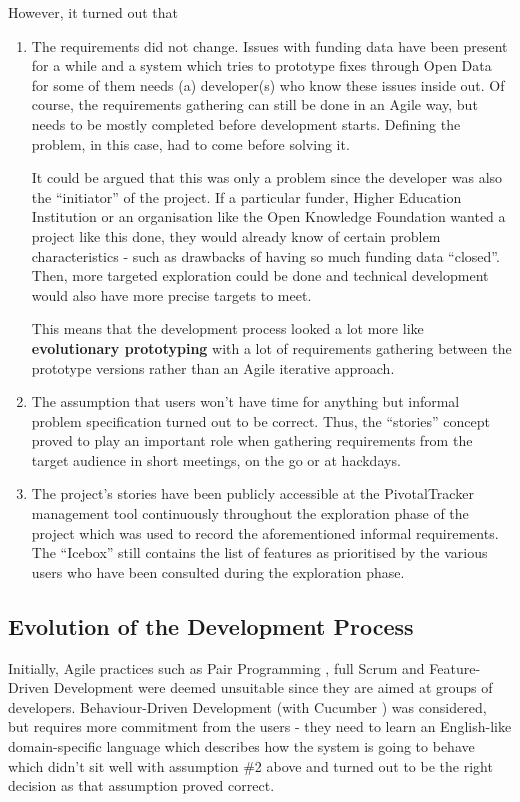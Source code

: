However, it turned out that
\begin{enumerate}
 \item The requirements did not change. Issues with funding data have been present for a while and a system which tries to prototype fixes through Open Data for some of them needs (a) developer(s) who know these issues inside out. Of course, the requirements gathering can still be done in an Agile way, but needs to be mostly completed before development starts. Defining the problem, in this case, had to come before solving it.
 
 It could be argued that this was only a problem since the developer was also the ``initiator'' of the project. If a particular funder, Higher Education Institution or an organisation like the Open Knowledge Foundation wanted a project like this done, they would already know of certain problem characteristics - such as drawbacks of having so much funding data ``closed''. Then, more targeted exploration could be done and technical development would also have more precise targets to meet.
 
 This means that the development process looked a lot more like \textbf{evolutionary prototyping} with a lot of requirements gathering between the prototype versions rather than an Agile iterative approach.
 
 \item The assumption that users won't have time for anything but informal problem specification turned out to be correct. Thus, the ``stories'' concept proved to play an important role when gathering requirements from the target audience in short meetings, on the go or at hackdays.
 
 \item The project's stories have been publicly accessible at the PivotalTracker management tool continuously throughout the exploration phase of the project which was used to record the aforementioned informal requirements. The ``Icebox'' still contains the list of features as prioritised by the various users who have been consulted during the exploration phase.
\end{enumerate}

\subsection{Evolution of the Development Process}
Initially, Agile practices such as Pair Programming \cite{pairprg}, full Scrum \cite{Scrum} and Feature-Driven Development were deemed unsuitable since they are aimed at groups of developers. Behaviour-Driven Development (with Cucumber \cite{cucumber}) was considered, but requires more commitment from the users - they need to learn an English-like domain-specific language which describes how the system is going to behave which didn't sit well with assumption \#2 above and turned out to be the right decision as that assumption proved correct.

